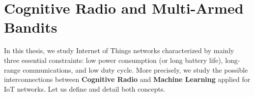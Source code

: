 

\section{Cognitive Radio and Multi-Armed Bandits}

In this thesis, we study Internet of Things networks characterized by mainly three essential constraints:
low power consumption (or long battery life),
long-range communications,
and low duty cycle.
%
More precisely, we study the possible interconnections between \textbf{Cognitive Radio} and \textbf{Machine Learning} applied for IoT networks.
Let us define and detail both concepts.





